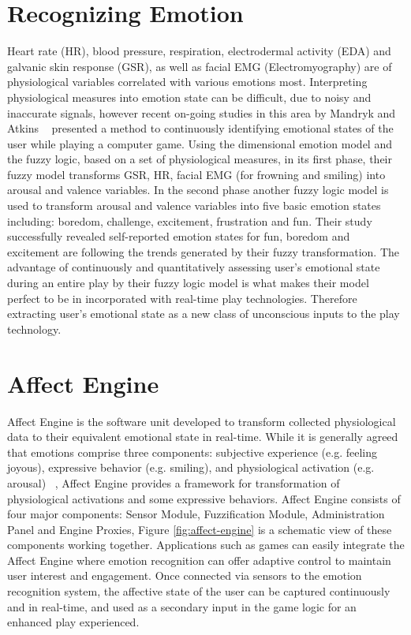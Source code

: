 \documentclass{uofsthesis-cs}
\begin{document}

\section{Recognizing Emotion} %
Heart rate (HR), blood pressure, respiration, electrodermal activity (EDA) and galvanic skin response (GSR), as well as facial EMG (Electromyography) are of physiological variables correlated with various emotions most. Interpreting physiological measures into emotion state can be difficult, due to noisy and inaccurate signals, however recent on-going studies in this area by Mandryk and Atkins ~\cite{mandryk2007fuzzy} presented a method to continuously identifying emotional states of the user while playing a computer game. Using the dimensional emotion model and the fuzzy logic, based on a set of physiological measures, in its first phase, their fuzzy model transforms GSR, HR, facial EMG (for frowning and smiling) into arousal and valence variables. In the second phase another fuzzy logic model is used to transform arousal and valence variables into five basic emotion states including: boredom, challenge, excitement, frustration and fun. Their study successfully revealed self-reported emotion states for fun, boredom and excitement are following the trends generated by their fuzzy transformation. The advantage of continuously and quantitatively assessing user's emotional state during an entire play by their fuzzy logic model is what makes their model perfect to be in incorporated with real-time play technologies. Therefore extracting user's emotional state as a new class of unconscious inputs to the play technology.


\section{Affect Engine} %
Affect Engine is the software unit developed to transform collected physiological data to their equivalent emotional state in real-time. While it is generally agreed that emotions comprise three components: subjective experience (e.g. feeling joyous), expressive behavior (e.g. smiling), and physiological activation (e.g. arousal) ~\cite{scherer1993neuroscience}, Affect Engine provides a framework for transformation of physiological activations and some expressive behaviors. Affect Engine consists of four major components: Sensor Module, Fuzzification Module, Administration Panel and Engine Proxies, Figure \ref{fig:affect-engine} is a schematic view of these components working together. Applications such as games can easily integrate the Affect Engine where emotion recognition can offer adaptive control to maintain user interest and engagement. Once connected via sensors to the emotion recognition system, the affective state of the user can be captured continuously and in real-time, and used as a secondary input in the game logic for an enhanced play experienced.
\end{document}
